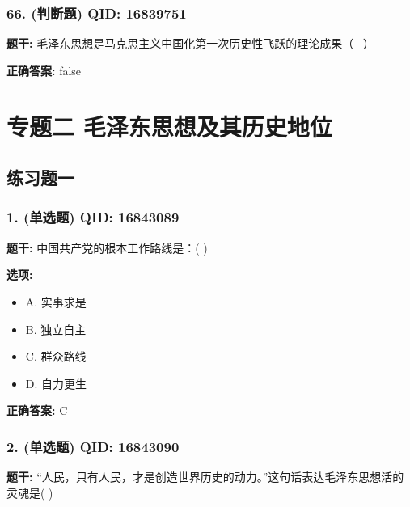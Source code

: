 \documentclass[12pt,UTF8]{ctexart}
\begin{document}
\subsubsection*{66. (判断题) \small QID: 16839751}

\textbf{题干:}
毛泽东思想是马克思主义中国化第一次历史性飞跃的理论成果（  ）

\textbf{正确答案:}
false

\vspace{0.3em}\hrulefill\vspace{0.7em}

\section*{专题二 毛泽东思想及其历史地位}
\hrulefill

\subsection*{练习题一}

\subsubsection*{1. (单选题) \small QID: 16843089}

\textbf{题干:}
中国共产党的根本工作路线是：( )

\textbf{选项:}
\begin{itemize}[leftmargin=*]

  \item A. 实事求是

  \item B. 独立自主

  \item C. 群众路线

  \item D. 自力更生

\end{itemize}

\textbf{正确答案:}
C

\vspace{0.3em}\hrulefill\vspace{0.7em}

\subsubsection*{2. (单选题) \small QID: 16843090}

\textbf{题干:}
“人民，只有人民，才是创造世界历史的动力。”这句话表达毛泽东思想活的灵魂是( )
\end{document}
